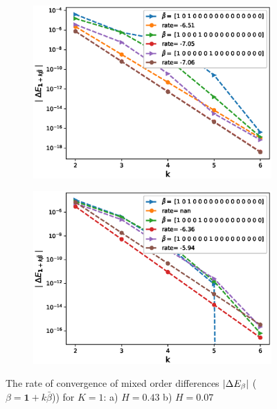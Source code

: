 \documentclass[11pt]{article}
\begin{document}
\begin{figure}[h!]
	\centering
	\begin{subfigure}{.5\textwidth}
		\centering
		\includegraphics[width=1\linewidth]{./figures/effect_H_differences/non_hierarchical/H_043/N_8/mixed_difference_order2_rbergomi_8steps_H_043_K_1_non_hierarch_with_rate_W1}
		\caption{}
		\label{fig:sub3}
	\end{subfigure}%
	\begin{subfigure}{.5\textwidth}
		\centering
		\includegraphics[width=1\linewidth]{./figures/effect_H_differences/non_hierarchical/H_007/N_8/mixed_difference_order2_rbergomi_8steps_H_007_K_1_non_hierarch_with_rate_W1}
		\caption{}
		\label{fig:sub4}
	\end{subfigure}
	
	\caption{The rate of convergence of  mixed order differences $\left\lvert\Delta E_{\beta}\right\rvert$ ($\beta=\mathbf{1}+k \bar{\beta}$)) for $K=1$: a) $H=0.43$ b)  $H=0.07$}
	\label{fig:test2}
\end{figure}
\end{document}
